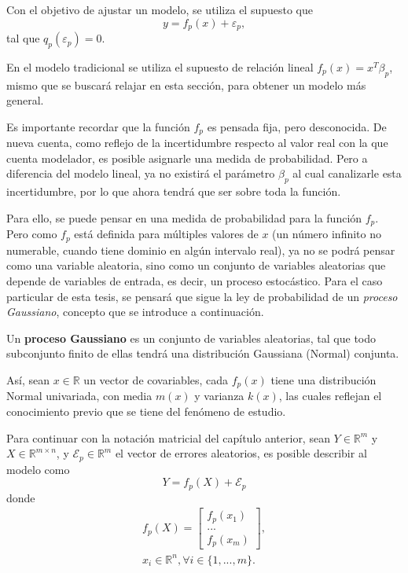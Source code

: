 Con el objetivo de ajustar un modelo, se utiliza el supuesto que
\begin{equation*}
    y = f_p(x) + \varepsilon_p,
\end{equation*}
tal que $q_p(\varepsilon_p)=0$. 

En el modelo tradicional se utiliza el supuesto de relaci\'on lineal $f_p(x) = x^T\beta_p$, mismo que se buscar\'a relajar en esta secci\'on, para obtener un modelo m\'as general.

Es importante recordar que la función $f_p$ es pensada fija, pero desconocida. De nueva cuenta, como reflejo de la incertidumbre respecto al valor real con la que cuenta modelador, es posible asignarle una medida de probabilidad. Pero a diferencia del modelo lineal, ya no existir\'a el parámetro $\beta_p$ al cual canalizarle esta incertidumbre, por lo que ahora tendrá que ser sobre toda la función.

Para ello, se puede pensar en una medida de probabilidad para la funci\'on $f_p$. Pero como $f_p$ est\'a definida para m\'ultiples valores de $x$ (un n\'umero infinito no numerable, cuando tiene dominio en alg\'un intervalo real), ya no se podr\'a pensar como una variable aleatoria, sino como un conjunto de variables aleatorias que depende de variables de entrada, es decir, un proceso estoc\'astico. Para el caso particular de esta tesis, se pensar\'a que sigue la ley de probabilidad de un \textit{proceso Gaussiano}, concepto que se introduce a continuaci\'on.

\begin{defin}
    Un \textbf{proceso Gaussiano} es un conjunto de variables aleatorias, tal que todo subconjunto finito de ellas tendr\'a una distribuci\'on Gaussiana (Normal) conjunta.
\end{defin}

As\'i, sean $x \in \mathbb{R}$ un vector de covariables, cada $f_p(x)$ tiene una distribuci\'on Normal univariada, con media $m(x)$ y varianza $k(x)$, las cuales reflejan el conocimiento previo que se tiene del fenómeno de estudio. 

Para continuar con la notación matricial del cap\'itulo anterior, sean $Y \in \mathbb{R}^m$ y $X \in \mathbb{R}^{m \times n}$, y $\mathcal{E}_p \in \mathbb{R}^m$ el vector de errores aleatorios, es posible describir al modelo como
\begin{equation*}
    Y = f_p(X) + \mathcal{E}_p
\end{equation*}
donde
\begin{equation*}
\begin{aligned}
    f_p(X) =     
    \left[
        \begin{array}{c}
        f_p(x_1)  \\
        ... \\
        f_p(x_m)
        \end{array}
    \right], \\
    x_i \in \mathbb{R}^n, \forall i \in \{1,...,m\}.
\end{aligned}
\end{equation*}

